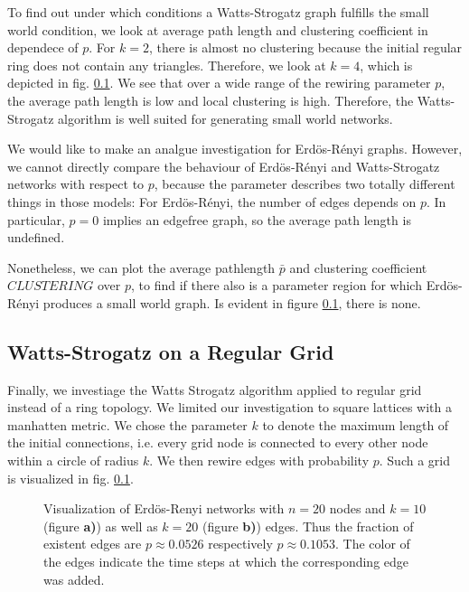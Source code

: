 \documentclass{scrartcl}
\begin{document}
To find out under which conditions a Watts-Strogatz graph fulfills the small world condition, we look at average path length and clustering coefficient in dependece of $p$. For $k=2$, there is almost no clustering because the initial regular ring does not contain any triangles. Therefore, we look at $k=4$, which is depicted in fig. \ref{}. We see that over a wide range of the rewiring parameter $p$, the average path length is low and local clustering is high. Therefore, the Watts-Strogatz algorithm is well suited for generating small world networks.

We would like to make an analgue investigation for Erdös-Rényi graphs. However, we cannot directly compare the behaviour of Erdös-Rényi and Watts-Strogatz networks with respect to $p$, because the parameter describes two totally different things in those models: For Erdös-Rényi, the number of edges depends on $p$. In particular, $p=0$ implies an edgefree graph, so the average path length is undefined. 

Nonetheless, we can plot the average pathlength $\bar{p}$ and clustering coefficient $CLUSTERING$ over $p$, to find if there also is a parameter region for which Erdös-Rényi produces a small world graph. Is evident in figure \ref{}, there is none.

\subsection{Watts-Strogatz on a Regular Grid}
Finally, we investiage the Watts Strogatz algorithm applied to regular grid instead of a ring topology. We limited our investigation to square lattices with a manhatten metric. We chose the parameter $k$ to denote the maximum length of the initial connections, i.e. every grid node is connected to every other node within a circle of radius $k$. We then rewire edges with probability $p$. Such a grid is visualized in fig. \ref{}. 

\begin{figure}
    \centering
    \def\svgwidth{0.8\columnwidth}
    
    \caption{Visualization of Erdös-Renyi networks with $n=20$ nodes and $k = 10$ (figure \textbf{a)}) as well as $k = 20$ (figure \textbf{b)}) edges. Thus the fraction of existent edges are $p \approx 0.0526$ respectively $p \approx 0.1053$. The color of the edges indicate the time steps at which the corresponding edge was added.}
    \label{11_er}
\end{figure}
\end{document}
